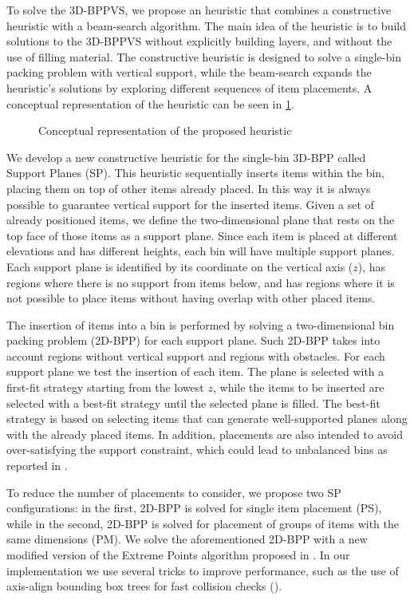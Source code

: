 \documentclass[11pt,a4paper,twocolumn]{article}
\begin{document}
To solve the 3D-BPPVS, we propose an heuristic that combines a constructive heuristic with a beam-search algorithm.
The main idea of the heuristic is to build solutions to the 3D-BPPVS without explicitly building layers, and without the use of filling material.
The constructive heuristic is designed to solve a single-bin packing problem with vertical support, while the beam-search expands the heuristic's solutions by exploring different sequences of item placements.
A conceptual representation of the heuristic can be seen in \cref{fig:heur_scheme}.
\begin{figure}[h]
    \resizebox{\columnwidth}{!}{%
    
    }
    \caption{Conceptual representation of the proposed heuristic}
    \label{fig:heur_scheme}
\end{figure}


We develop a new constructive heuristic for the single-bin 3D-BPP called Support Planes (SP).
This heuristic sequentially inserts items within the bin, placing them on top of other items already placed.
In this way it is always possible to guarantee vertical support for the inserted items.
Given a set of already positioned items, we define the two-dimensional plane that rests on the top face of those items as a support plane. Since each item is placed at different elevations and has different heights, each bin will have multiple support planes. Each support plane is identified by its coordinate on the vertical axis ($z$), has regions where there is no support from items below, and has regions where it is not possible to place items without having overlap with other placed items.

The insertion of items into a bin is performed by solving a two-dimensional bin packing problem (2D-BPP) for each support plane. 
Such 2D-BPP takes into account regions without vertical support and regions with obstacles.
For each support plane we test the insertion of each item. The plane is selected with a first-fit strategy starting from the lowest $z$, while the items to be inserted are selected with a best-fit strategy until the selected plane is filled.
The best-fit strategy is based on selecting items that can generate well-supported planes along with the already placed items. In addition, placements are also intended to avoid over-satisfying the support constraint, which could lead to unbalanced bins as reported in \cite{elhedhli2019three}.

To reduce the number of placements to consider, we propose two SP configurations: in the first, 2D-BPP is solved for single item placement (PS), while in the second, 2D-BPP is solved for placement of groups of items with the same dimensions (PM).
We solve the aforementioned 2D-BPP with a new modified version of the Extreme Points algorithm proposed in \cite{crainic2008extreme}.
In our implementation we use several tricks to improve performance, such as the use of axis-align bounding box trees for fast collision checks (\cite{bergen1997efficient}).
\end{document}
